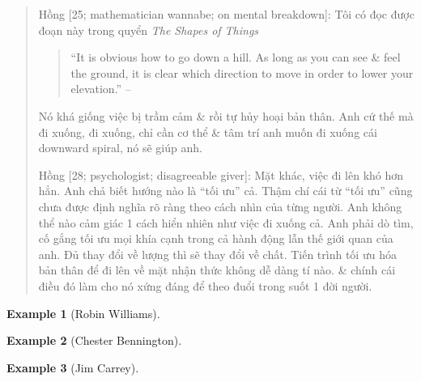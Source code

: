 \documentclass[12pt]{article}
\newtheorem{example}{Example}
\begin{document}
\begin{quote}
	{\sf Hồng [25; mathematician wannabe; on mental breakdown]}: Tôi có đọc được đoạn này trong quyển {\it The Shapes of Things}
	\begin{quote}
		``It is obvious how to go down a hill. As long as you can see \& feel the ground, it is clear which direction to move in order to lower your elevation.'' -- \cite[Sect. 1.2.3: {\it Sequentil Optimization of Shape, Which Way Is Down?}, p. 2]{Walker2015}
	\end{quote}
	Nó khá giống việc bị trầm cảm \& rồi tự hủy hoại bản thân. Anh cứ thế mà đi xuống, đi xuống, chỉ cần cơ thể \& tâm trí anh muốn đi xuống cái downward spiral, nó sẽ giúp anh.
	
	{\sf Hồng [28; psychologist; disagreeable giver]}: Mặt khác, việc đi lên khó hơn hẳn. Anh chả biết hướng nào là ``tối ưu'' cả. Thậm chí cái từ ``tối ưu'' cũng chưa được định nghĩa rõ ràng theo cách nhìn của từng người. Anh không thể nào cảm giác 1 cách hiển nhiên như việc đi xuống cả. Anh phải dò tìm, cố gắng tối ưu mọi khía cạnh trong cả hành động lẫn thế giới quan của anh. Đủ thay đổi về lượng thì sẽ thay đổi về chất. Tiến trình tối ưu hóa bản thân để đi lên về mặt nhận thức không dễ dàng tí nào. \& chính cái điều đó làm cho nó xứng đáng để theo đuổi trong suốt 1 đời người.
\end{quote}

\begin{example}[{\sc Robin Williams}]
	
\end{example}

\begin{example}[{\sc Chester Bennington}]
	
\end{example}

\begin{example}[{\sc Jim Carrey}]
	
\end{example}

\end{document}
